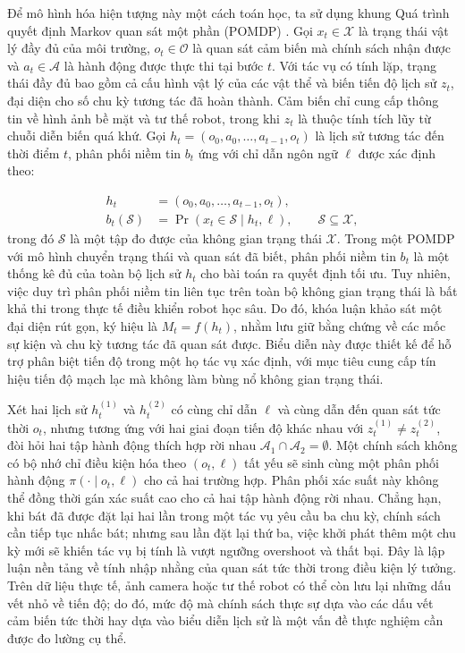Để mô hình hóa hiện tượng này một cách toán học, ta sử dụng khung Quá trình quyết định Markov quan sát một phần (POMDP) \cite{pomdp1998}. Gọi $x_t \in \mathcal X$ là trạng thái vật lý đầy đủ của môi trường, $o_t \in \mathcal O$ là quan sát cảm biến mà chính sách nhận được và $a_t \in \mathcal A$ là hành động được thực thi tại bước $t$. Với tác vụ có tính lặp, trạng thái đầy đủ bao gồm cả cấu hình vật lý của các vật thể và biến tiến độ lịch sử $z_t$, đại diện cho số chu kỳ tương tác đã hoàn thành. Cảm biến chỉ cung cấp thông tin về hình ảnh bề mặt và tư thế robot, trong khi $z_t$ là thuộc tính tích lũy từ chuỗi diễn biến quá khứ. Gọi $h_t = (o_0, a_0, \ldots, a_{t-1}, o_t)$ là lịch sử tương tác đến thời điểm $t$, phân phối niềm tin $b_t$ ứng với chỉ dẫn ngôn ngữ $\ell$ được xác định theo:

\begin{equation}
\begin{aligned}
h_t &= (o_0,a_0,\ldots,a_{t-1},o_t),\\
b_t(\mathcal S) &= \Pr(x_t\in \mathcal S\mid h_t,\ell),\qquad \mathcal S\subseteq\mathcal X,
\end{aligned}
\end{equation}
trong đó $\mathcal S$ là một tập đo được của không gian trạng thái $\mathcal X$. Trong một POMDP với mô hình chuyển trạng thái và quan sát đã biết, phân phối niềm tin $b_t$ là một thống kê đủ của toàn bộ lịch sử $h_t$ cho bài toán ra quyết định tối ưu. Tuy nhiên, việc duy trì phân phối niềm tin liên tục trên toàn bộ không gian trạng thái là bất khả thi trong thực tế điều khiển robot học sâu. Do đó, khóa luận khảo sát một đại diện rút gọn, ký hiệu là $M_t = f(h_t)$, nhằm lưu giữ bằng chứng về các mốc sự kiện và chu kỳ tương tác đã quan sát được. Biểu diễn này được thiết kế để hỗ trợ phân biệt tiến độ trong một họ tác vụ xác định, với mục tiêu cung cấp tín hiệu tiến độ mạch lạc mà không làm bùng nổ không gian trạng thái.

Xét hai lịch sử $h_t^{(1)}$ và $h_t^{(2)}$ có cùng chỉ dẫn $\ell$ và cùng dẫn đến quan sát tức thời $o_t$, nhưng tương ứng với hai giai đoạn tiến độ khác nhau với $z_t^{(1)} \neq z_t^{(2)}$, đòi hỏi hai tập hành động thích hợp rời nhau $\mathcal A_1 \cap \mathcal A_2 = \emptyset$. Một chính sách không có bộ nhớ chỉ điều kiện hóa theo $(o_t, \ell)$ tất yếu sẽ sinh cùng một phân phối hành động $\pi(\cdot \mid o_t, \ell)$ cho cả hai trường hợp. Phân phối xác suất này không thể đồng thời gán xác suất cao cho cả hai tập hành động rời nhau. Chẳng hạn, khi bát đã được đặt lại hai lần trong một tác vụ yêu cầu ba chu kỳ, chính sách cần tiếp tục nhấc bát; nhưng sau lần đặt lại thứ ba, việc khởi phát thêm một chu kỳ mới sẽ khiến tác vụ bị tính là vượt ngưỡng overshoot và thất bại. Đây là lập luận nền tảng về tính nhập nhằng của quan sát tức thời trong điều kiện lý tưởng. Trên dữ liệu thực tế, ảnh camera hoặc tư thế robot có thể còn lưu lại những dấu vết nhỏ về tiến độ; do đó, mức độ mà chính sách thực sự dựa vào các dấu vết cảm biến tức thời hay dựa vào biểu diễn lịch sử là một vấn đề thực nghiệm cần được đo lường cụ thể.

